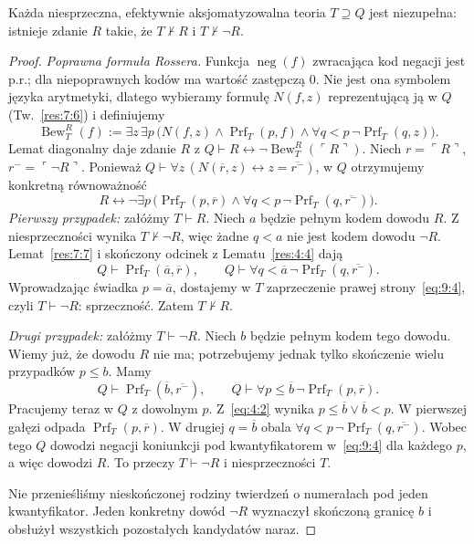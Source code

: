 \begin{twierdzenie}\label{res:9:4}
Każda niesprzeczna, efektywnie aksjomatyzowalna teoria $T\supseteq Q$ jest niezupełna: istnieje zdanie $R$ takie, że $T\nvdash R$ i $T\nvdash\neg R$.
\end{twierdzenie}
\begin{proof}
\emph{Poprawna formuła Rossera.} Funkcja $\operatorname{neg}(f)$ zwracająca kod negacji jest p.r.; dla niepoprawnych kodów ma wartość zastępczą $0$. Nie jest ona symbolem języka arytmetyki, dlatego wybieramy formułę $N(f,z)$ reprezentującą ją w $Q$ (Tw.~\ref{res:7:6}) i definiujemy
\[
\operatorname{Bew}_T^{R}(f):=\exists z\,\exists p\,
\bigl(N(f,z)\land\operatorname{Prf}_T(p,f)\land\forall q<p\,\neg\operatorname{Prf}_T(q,z)\bigr).
\]
Lemat diagonalny daje zdanie $R$ z $Q\vdash R\leftrightarrow\neg\operatorname{Bew}_T^R(\ulcorner R\urcorner)$. Niech $r=\ulcorner R\urcorner$, $r^-=\ulcorner\neg R\urcorner$. Ponieważ $Q\vdash\forall z\,(N(\overline r,z)\leftrightarrow z=\overline{r^-})$, w $Q$ otrzymujemy konkretną równoważność
\begin{equation}\label{eq:9:4}
R\leftrightarrow\neg\exists p\,
\bigl(\operatorname{Prf}_T(p,\overline r)\land
\forall q<p\,\neg\operatorname{Prf}_T(q,\overline{r^-})\bigr).
\end{equation}
\emph{Pierwszy przypadek:} załóżmy $T\vdash R$. Niech $a$ będzie pełnym kodem dowodu $R$. Z niesprzeczności wynika $T\nvdash\neg R$, więc żadne $q<a$ nie jest kodem dowodu $\neg R$. Lemat~\ref{res:7:7} i skończony odcinek z Lematu~\ref{res:4:4} dają
\[
Q\vdash\operatorname{Prf}_T(\overline a,\overline r),\qquad
Q\vdash\forall q<\overline a\,\neg\operatorname{Prf}_T(q,\overline{r^-}).
\]
Wprowadzając świadka $p=\overline a$, dostajemy w $T$ zaprzeczenie prawej strony~\eqref{eq:9:4}, czyli $T\vdash\neg R$: sprzeczność. Zatem $T\nvdash R$.

\emph{Drugi przypadek:} załóżmy $T\vdash\neg R$. Niech $b$ będzie pełnym kodem tego dowodu. Wiemy już, że dowodu $R$ nie ma; potrzebujemy jednak tylko skończenie wielu przypadków $p\le b$. Mamy
\[
Q\vdash\operatorname{Prf}_T(\overline b,\overline{r^-}),\qquad
Q\vdash\forall p\le\overline b\,\neg\operatorname{Prf}_T(p,\overline r).
\]
Pracujemy teraz w $Q$ z dowolnym $p$. Z~\eqref{eq:4:2} wynika $p\le\overline b\lor\overline b<p$. W pierwszej gałęzi odpada $\operatorname{Prf}_T(p,\overline r)$. W drugiej $q=\overline b$ obala $\forall q<p\,\neg\operatorname{Prf}_T(q,\overline{r^-})$. Wobec tego $Q$ dowodzi negacji koniunkcji pod kwantyfikatorem w~\eqref{eq:9:4} dla każdego $p$, a więc dowodzi $R$. To przeczy $T\vdash\neg R$ i niesprzeczności $T$.

Nie przenieśliśmy nieskończonej rodziny twierdzeń o numerałach pod jeden kwantyfikator. Jeden konkretny dowód $\neg R$ wyznaczył skończoną granicę $b$ i obsłużył wszystkich pozostałych kandydatów naraz.
\end{proof}

